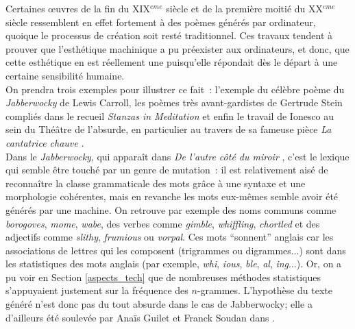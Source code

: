 \documentclass{article}
\begin{document}
				Certaines œuvres de la fin du XIX$^{eme}$ siècle et de la première moitié du XX$^{eme}$ siècle ressemblent en effet fortement à des poèmes générés par ordinateur, quoique le processus de création soit resté traditionnel. Ces travaux tendent à prouver que l'esthétique machinique a pu préexister aux ordinateurs, et donc, que cette esthétique en est réellement une puisqu'elle répondait dès le départ à une certaine sensibilité humaine.\\
				On prendra trois exemples pour illustrer ce fait~: l'exemple du célèbre poème du \textit{Jabberwocky} de Lewis Carroll, les poèmes très avant-gardistes de Gertrude Stein compliés dans le recueil \textit{Stanzas in Meditation} \cite{stein1932} et enfin le travail de Ionesco au sein du Théâtre de l'absurde, en particulier au travers de sa fameuse pièce \textit{La cantatrice chauve} \cite{ionesco1950}.\\
				
				Dans le \textit{Jabberwocky}, qui apparaît dans \textit{De l'autre côté du miroir} \cite{carroll1871}, c'est le lexique qui semble être touché par un genre de mutation~: il est relativement aisé de reconnaître la classe grammaticale des mots grâce à une syntaxe et une morphologie cohérentes, mais en revanche les mots eux-mêmes semble avoir été générés par une machine. On retrouve par exemple des noms communs comme \textit{borogoves}, \textit{mome}, \textit{wabe}, des verbes comme \textit{gimble}, \textit{whiffling}, \textit{chortled} et des adjectifs comme \textit{slithy}, \textit{frumious} ou \textit{vorpal}. Ces mots ``sonnent'' anglais car les associations de lettres qui les composent (trigrammes ou digrammes...) sont dans les statistiques des mots anglais (par exemple, \textit{whi}, \textit{ious}, \textit{ble}, \textit{al}, \textit{ing}...). Or, on a pu voir en Section \ref{aspects_tech} que de nombreuses méthodes statistiques s'appuyaient justement sur la fréquence des $n$-grammes. L'hypothèse du texte généré n'est donc pas du tout absurde dans le cas de Jabberwocky; elle a d'ailleurs été soulevée par Anaïs Guilet et Franck Soudan dans \cite{guilet2017}.\\
				
\end{document}
